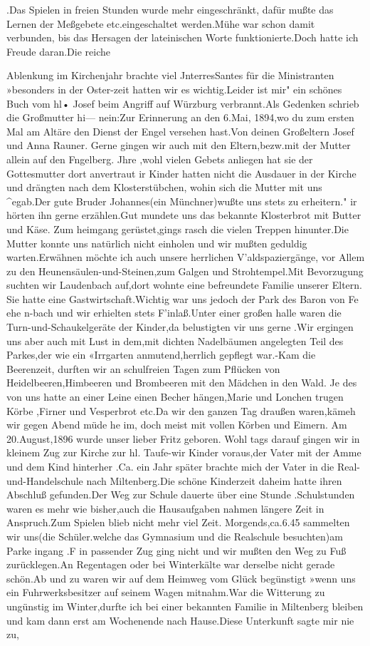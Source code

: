\documentclass[a4paper,11pt]{article}
\begin{document}
.Das Spielen in freien Stunden wurde mehr eingeschränkt, dafür mußte das Lernen der Meßgebete etc.eingeschaltet werden.Mühe war schon damit verbunden, bis das Hersagen der lateinischen Worte funktionierte.Doch hatte ich Freude daran.Die reiche

Ablenkung im Kirchenjahr brachte viel JnterresSantes für die Ministranten »besonders in der Oster-zeit hatten wir es wichtig.Leider ist mir" ein schönes Buch vom hl• Josef beim Angriff auf Würzburg verbrannt.Als Gedenken schrieb die Großmutter hi— nein:Zur Erinnerung an den 6.Mai, 1894,wo du zum ersten Mal am Altäre den Dienst der Engel versehen hast.Von deinen Großeltern Josef und Anna Rauner. Gerne gingen wir auch mit den Eltern,bezw.mit der Mutter allein auf den Fngelberg. Jhre ,wohl vielen Gebets anliegen hat sie der Gottesmutter dort anvertraut ir Kinder hatten nicht die Ausdauer in der Kirche und drängten nach dem Klosterstübchen, wohin sich die Mutter mit uns ^egab.Der gute Bruder Johannes(ein Münchner)wußte uns stets zu erheitern." ir hörten ihn gerne erzählen.Gut mundete uns das bekannte Klosterbrot mit Butter und Käse. Zum heimgang gerüstet,gings rasch die vielen Treppen hinunter.Die Mutter konnte uns natürlich nicht einholen und wir mußten geduldig warten.Erwähnen möchte ich auch unsere herrlichen V’aldspaziergänge, vor Allem zu den Heunensäulen-und-Steinen,zum Galgen und Strohtempel.Mit Bevorzugung suchten wir Laudenbach auf,dort wohnte eine befreundete Familie unserer Eltern. Sie hatte eine Gastwirtschaft.Wichtig war uns jedoch der Park des Baron von Fe ehe n-bach und wir erhielten stets F'inlaß.Unter einer großen halle waren die Turn-und-Schaukelgeräte der Kinder,da belustigten vir uns gerne .Wir ergingen uns aber auch mit Lust in dem,mit dichten Nadelbäumen angelegten Teil des Parkes,der wie ein «Irrgarten anmutend,herrlich gepflegt war.-Kam die Beerenzeit, durften wir an schulfreien Tagen zum Pflücken von Heidelbeeren,Himbeeren und Brombeeren mit den Mädchen in den Wald. Je des von uns hatte an einer Leine einen Becher hängen,Marie und Lonchen trugen Körbe ,Firner und Vesperbrot etc.Da wir den ganzen Tag draußen waren,kämeh wir gegen Abend müde he im, doch meist mit vollen Körben und Eimern. Am 20.August,1896 wurde unser lieber Fritz geboren. Wohl tags darauf gingen wir in kleinem Zug zur Kirche zur hl. Taufe-wir Kinder voraus,der Vater mit der Amme und dem Kind hinterher .Ca. ein Jahr später brachte mich der Vater in die Real-und-Handelschule nach Miltenberg.Die schöne Kinderzeit daheim hatte ihren Abschluß gefunden.Der Weg zur Schule dauerte über eine Stunde .Schulstunden waren es mehr wie bisher,auch die Hausaufgaben nahmen längere Zeit in Anspruch.Zum Spielen blieb nicht mehr viel Zeit. Morgends,ca.6.45 sammelten wir uns(die Schüler.welche das Gymnasium und die Realschule besuchten)am Parke ingang .F in passender Zug ging nicht und wir mußten den Weg zu Fuß zurücklegen.An Regentagen oder bei Winterkälte war derselbe nicht gerade schön.Ab und zu waren wir auf dem Heimweg vom Glück begünstigt »wenn uns ein Fuhrwerksbesitzer auf seinem Wagen mitnahm.War die Witterung zu ungünstig im Winter,durfte ich bei einer bekannten Familie in Miltenberg bleiben und kam dann erst am Wochenende nach Hause.Diese Unterkunft sagte mir nie zu,
\end{document}
